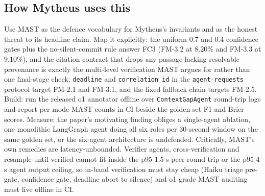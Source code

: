 \subsection{How Mytheus uses this}
\begin{takeaway}
Use MAST as the defence vocabulary for Mytheus's invariants and as the honest threat to its headline claim. Map it explicitly: the uniform 0.7 and 0.4 confidence gates plus the no-silent-commit rule answer FC3 (FM-3.2 at 8.20\% and FM-3.3 at 9.10\%), and the citation contract that drops any passage lacking resolvable provenance is exactly the multi-level verification MAST argues for rather than one final-stage check; \texttt{deadline} and \texttt{correlation\_id} in the \texttt{agent-requests} protocol target FM-2.1 and FM-3.1, and the fixed fallback chain targets FM-2.5. Build: run the released o1 annotator offline over \texttt{ContextGapAgent} round-trip logs and report per-mode MAST counts in CI beside the golden-set F1 and Brier scores. Measure: the paper's motivating finding obliges a single-agent ablation, one monolithic LangGraph agent doing all six roles per 30-second window on the same golden set, or the six-agent architecture is undefended. Critically, MAST's own remedies are latency-unbounded. Verifier agents, cross-verification and resample-until-verified cannot fit inside the p95 1.5 s peer round trip or the p95 4 s agent output ceiling, so in-band verification must stay cheap (Haiku triage pre-gate, confidence gate, deadline abort to silence) and o1-grade MAST auditing must live offline in CI.
\end{takeaway}

